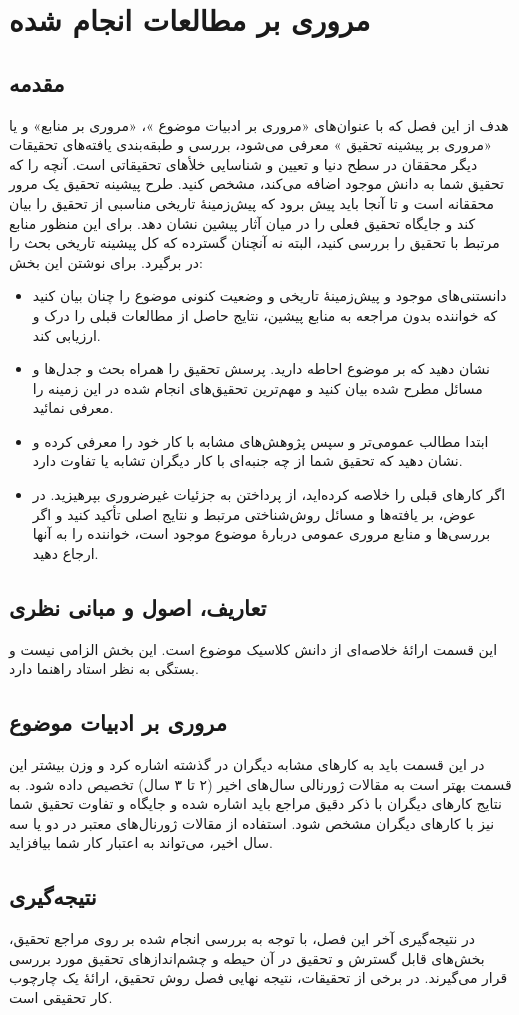 \chapter{مروری بر مطالعات انجام شده}
\section{مقدمه}
هدف از اين فصل که با عنوان‌های  «مروری بر ادبیات موضوع%
»،
«مروری بر منابع» و يا «مروری بر پیشینه تحقیق%
»
معرفی می‌شود، بررسی و طبقه‌بندی یافته‌های تحقیقات دیگر محققان در سطح دنیا و تعیین و شناسایی خلأهای تحقیقاتی است. آنچه را که تحقیق شما به دانش موجود اضافه می‌کند، مشخص کنید. طرح پیشینه تحقیق%
یک مرور محققانه است و تا آنجا باید پیش برود که پیش‌زمینهٔ تاریخی مناسبی از تحقیق را بیان کند و جایگاه تحقیق فعلی را در میان آثار پیشین نشان دهد. برای این منظور منابع مرتبط با تحقیق را بررسی کنید، البته نه آنچنان گسترده که کل پیشینه تاریخی بحث را در برگیرد. برای نوشتن این بخش:
\begin{itemize}
	\item
	دانستنی‌های موجود و پیش‌زمینهٔ تاریخی و وضعیت کنونی موضوع را چنان بیان کنید که خواننده بدون مراجعه به منابع پیشین، نتایج حاصل از مطالعات قبلی را درک و ارزیابی کند.
	\item
	نشان دهید که بر موضوع احاطه دارید. پرسش تحقیق را همراه بحث و جدل‌ها و مسائل مطرح شده بیان کنید و مهم‌ترین تحقیق‌های انجام شده در این زمینه را معرفی نمائید.
	\item
	ابتدا مطالب عمومی‌تر و سپس پژوهش‌های مشابه با کار خود را معرفی کرده و نشان دهید که تحقیق شما از چه جنبه‌ای با کار دیگران تشابه یا تفاوت دارد.
	\item
	اگر کارهای قبلی را خلاصه کرده‌اید، از پرداختن به جزئیات غیرضروری بپرهیزید. در عوض، بر یافته‌ها و مسائل روش‌شناختی مرتبط و نتایج اصلی تأکید کنید و اگر بررسی‌ها و منابع مروری عمومی دربارهٔ موضوع موجود است، خواننده را به آنها ارجاع دهید.
\end{itemize}

\section{تعاریف، اصول و مبانی نظری}
این قسمت ارائهٔ خلاصه‌ای از دانش کلاسیک موضوع است. این بخش الزامی نیست و بستگی به نظر استاد راهنما دارد.

\section{مروری بر ادبیات موضوع}
در این قسمت باید به کارهای مشابه دیگران در گذشته اشاره کرد و وزن بیشتر این قسمت بهتر است به مقالات ژورنالی سال‌های اخیر (۲ تا ۳ سال) تخصیص داده شود. به نتایج کارهای دیگران با ذکر دقیق مراجع باید اشاره شده و جایگاه و تفاوت تحقیق شما نیز با کارهای دیگران مشخص شود. استفاده از مقالات ژورنال‌های معتبر در دو یا سه سال اخیر، می‌تواند به اعتبار کار شما بیافزاید.

\section{نتیجه‌گیری}
‌در نتیجه‌گیری آخر این فصل، با توجه به بررسی انجام شده بر روی مراجع تحقيق، بخش‌های قابل گسترش و تحقیق در آن حیطه و چشم‌اندازهای تحقیق مورد بررسی قرار می‌گیرند.	در برخی از تحقیقات، نتیجه نهایی فصل روش تحقیق، ارائهٔ یک چارچوب کار تحقیقی 
است.